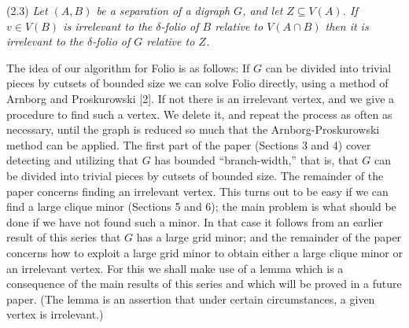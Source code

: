 \stmt
(2.3) \textit{Let $(A, B)$ be a separation of a digraph $G$, and let $Z \subseteq V(A)$. If $v \in V(B)$ is irrelevant to the $\delta$-folio of $B$ relative to $V(A \cap B)$ then it is irrelevant to the $\delta$-folio of $G$ relative to $Z$.}


The idea of our algorithm for Folio is as follows: If $G$ can be divided into trivial pieces by cutsets of bounded size we can solve Folio directly, using a method of Arnborg and Proskurowski [2]. If not there is an irrelevant vertex, and we give a procedure to find such a vertex. We delete it, and repeat the process as often as necessary, until the graph is reduced so much that the Arnborg-Proskurowski method can be applied. The first part of the paper (Sections 3 and 4) cover detecting and utilizing that $G$ has bounded ``branch-width,'' that is, that $G$ can be divided into trivial pieces by cutsets of bounded size. The remainder of the paper concerns finding an irrelevant vertex. This turns out to be easy if we can find a large clique minor (Sections 5 and 6); the main problem is what should be done if we have not found such a minor. In that case it follows from an earlier result of this series that $G$ has a large grid minor; and the remainder of the paper concerns how to exploit a large grid minor to obtain either a large clique minor or an irrelevant vertex. For this we shall make use of a lemma which is a consequence of the main results of this series and which will be proved in a future paper. (The lemma is an assertion that under certain circumstances, a given vertex is irrelevant.)

